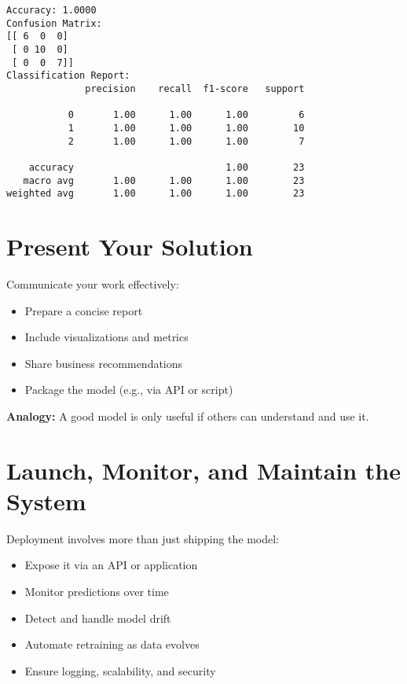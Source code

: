 \documentclass[
  letterpaper,
  DIV=11,
  numbers=noendperiod]{scrreprt}
\providecommand{\tightlist}{%
  \setlength{\itemsep}{0pt}\setlength{\parskip}{0pt}}\usepackage{longtable,booktabs,array}
\begin{document}
\begin{verbatim}
Accuracy: 1.0000
Confusion Matrix:
[[ 6  0  0]
 [ 0 10  0]
 [ 0  0  7]]
Classification Report:
              precision    recall  f1-score   support

           0       1.00      1.00      1.00         6
           1       1.00      1.00      1.00        10
           2       1.00      1.00      1.00         7

    accuracy                           1.00        23
   macro avg       1.00      1.00      1.00        23
weighted avg       1.00      1.00      1.00        23
\end{verbatim}

\section{Present Your Solution}\label{present-your-solution}

Communicate your work effectively:

\begin{itemize}
\tightlist
\item
  Prepare a concise report\\
\item
  Include visualizations and metrics\\
\item
  Share business recommendations\\
\item
  Package the model (e.g., via API or script)
\end{itemize}

\textbf{Analogy:} A good model is only useful if others can understand
and use it.

\section{Launch, Monitor, and Maintain the
System}\label{launch-monitor-and-maintain-the-system}

Deployment involves more than just shipping the model:

\begin{itemize}
\tightlist
\item
  Expose it via an API or application\\
\item
  Monitor predictions over time\\
\item
  Detect and handle model drift\\
\item
  Automate retraining as data evolves\\
\item
  Ensure logging, scalability, and security
\end{itemize}
\end{document}

